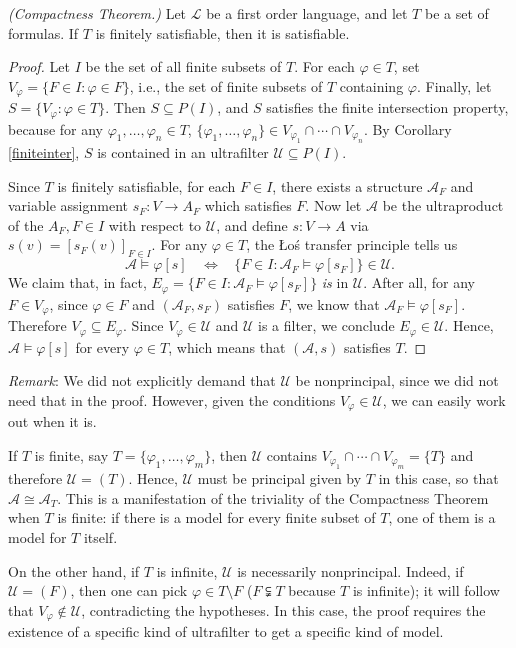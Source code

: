 \documentclass{article}
\def\A{\mathcal A}
\def\Lang{\mathcal L}
\def\U{\mathscr U}
\begin{document}
\begin{theorem}\label{compactness}
\emph{(Compactness Theorem.)} Let $\Lang$ be a first order language, and let $T$ be a set of formulas.  If $T$ is finitely satisfiable, then it is satisfiable.
\end{theorem}
\begin{proof}
Let $I$ be the set of all finite subsets of $T$.  For each $\varphi\in T$, set $V_\varphi=\{F\in I:\varphi\in F\}$, i.e., the set of finite subsets of $T$ containing $\varphi$.  Finally, let $S=\{V_\varphi:\varphi\in T\}$.  Then $S\subseteq P(I)$, and $S$ satisfies the finite intersection property, because for any $\varphi_1,\dots,\varphi_n\in T$, $\{\varphi_1,\dots,\varphi_n\}\in V_{\varphi_1}\cap\cdots\cap V_{\varphi_n}$.  By Corollary \ref{finiteinter}, $S$ is contained in an ultrafilter $\U\subseteq P(I)$.

Since $T$ is finitely satisfiable, for each $F\in I$, there exists a structure $\A_F$ and variable assignment $s_F:V\to A_F$ which satisfies $F$.  Now let $\A$ be the ultraproduct of the $A_F,F\in I$ with respect to $\U$, and define $s:V\to A$ via $s(v)=[s_F(v)]_{F\in I}$.  For any $\varphi\in T$, the \L o\'s transfer principle tells us
$$\A\models\varphi[s]~~~~\iff~~~~\{F\in I:\A_F\models\varphi[s_F]\}\in\U.$$
We claim that, in fact, $E_\varphi=\{F\in I:\A_F\models\varphi[s_F]\}$ \emph{is} in $\U$.  After all, for any $F\in V_\varphi$, since $\varphi\in F$ and $(\A_F,s_F)$ satisfies $F$, we know that $\A_F\models\varphi[s_F]$.  Therefore $V_\varphi\subseteq E_\varphi$.  Since $V_\varphi\in\U$ and $\U$ is a filter, we conclude $E_\varphi\in\U$.  Hence, $\A\models\varphi[s]$ for every $\varphi\in T$, which means that $(\A,s)$ satisfies $T$.
\end{proof}
\noindent\emph{Remark}: We did not explicitly demand that $\U$ be nonprincipal, since we did not need that in the proof.  However, given the conditions $V_\varphi\in\U$, we can easily work out when it is.

If $T$ is finite, say $T=\{\varphi_1,\dots,\varphi_m\}$, then $\U$ contains $V_{\varphi_1}\cap\cdots\cap V_{\varphi_m}=\{T\}$ and therefore $\U=(T)$.  Hence, $\U$ must be principal given by $T$ in this case, so that $\A\cong\A_T$.  This is a manifestation of the triviality of the Compactness Theorem when $T$ is finite: if there is a model for every finite subset of $T$, one of them is a model for $T$ itself.

On the other hand, if $T$ is infinite, $\U$ is necessarily nonprincipal.  Indeed, if $\U=(F)$, then one can pick $\varphi\in T\setminus F$ ($F\subsetneqq T$ because $T$ is infinite); it will follow that $V_\varphi\notin\U$, contradicting the hypotheses.  In this case, the proof requires the existence of a specific kind of ultrafilter to get a specific kind of model.\\
\end{document}
